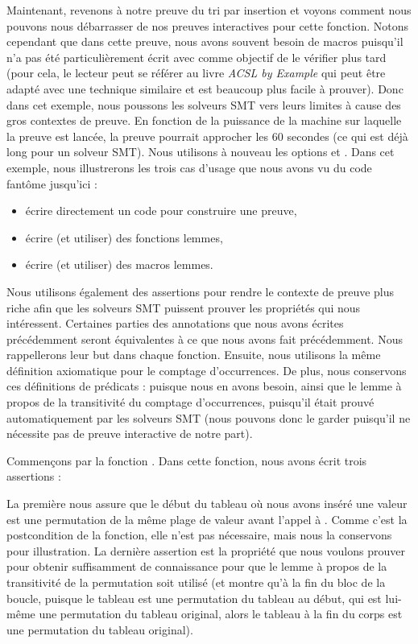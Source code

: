 Maintenant, revenons à notre preuve du tri par insertion et voyons comment nous
pouvons nous débarrasser de nos preuves interactives pour cette fonction. Notons
cependant que dans cette preuve, nous avons souvent besoin de macros puisqu'il
n'a pas été particulièrement écrit avec comme objectif de le vérifier plus tard
(pour cela, le lecteur peut se référer au livre \emph{ACSL by Example} qui peut être
adapté avec une technique similaire et est beaucoup plus facile à prouver). Donc
dans cet exemple, nous poussons les solveurs SMT vers leurs limites à cause des
gros contextes de preuve. En fonction de la puissance de la machine sur laquelle
la preuve est lancée, la preuve pourrait approcher les 60 secondes (ce qui est
déjà long pour un solveur SMT). Nous utilisons à nouveau les options
 et .
Dans cet exemple, nous illustrerons les trois
cas d'usage que nous avons vu du code fantôme jusqu'ici :
\begin{itemize}
    \item écrire directement un code pour construire une preuve,
    \item écrire (et utiliser) des fonctions lemmes,
    \item écrire (et utiliser) des macros lemmes.
\end{itemize}


Nous utilisons également des assertions pour rendre le contexte de preuve plus
riche afin que les solveurs SMT puissent prouver les propriétés qui nous intéressent.
Certaines parties des annotations que nous avons écrites précédemment seront
équivalentes à ce que nous avons fait précédemment. Nous rappellerons leur
but dans chaque fonction. Ensuite, nous utilisons la même définition axiomatique
pour le comptage d'occurrences. De plus, nous conservons ces définitions de
prédicats :
puisque nous en avons besoin, ainsi que le lemme à propos de la transitivité du
comptage d'occurrences, puisqu'il était prouvé automatiquement par les solveurs
SMT (nous pouvons donc le garder puisqu'il ne nécessite pas de preuve interactive
de notre part).




Commençons par la fonction . Dans cette fonction,
nous avons écrit trois assertions :




La première nous assure que le début du tableau où nous avons inséré une valeur
est une permutation de la même plage de valeur avant l'appel à .
Comme c'est la postcondition de la fonction, elle n'est pas nécessaire, mais nous
la conservons pour illustration. La dernière assertion est la propriété que
nous voulons prouver pour obtenir suffisamment de connaissance pour que le
lemme à propos de la transitivité de la permutation soit utilisé (et montre qu'à
la fin du bloc de la boucle, puisque le tableau est une permutation du tableau
au début, qui est lui-même une permutation du tableau original, alors le tableau
à la fin du corps est une permutation du tableau original).


